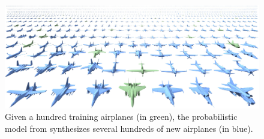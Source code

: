 \begin{figure}[t]
\centering
    \includegraphics[width=.95\columnwidth]{fig/img/kalogerakis_sig12_synthesis}
    \caption{
Given a hundred training airplanes (in green), the probabilistic model from \protect\cite{Kalogerakis:2012:PMC} synthesizes several hundreds of new airplanes (in blue).}
    \label{fig:kalogerakis_sig12_synthesis}
\end{figure}

